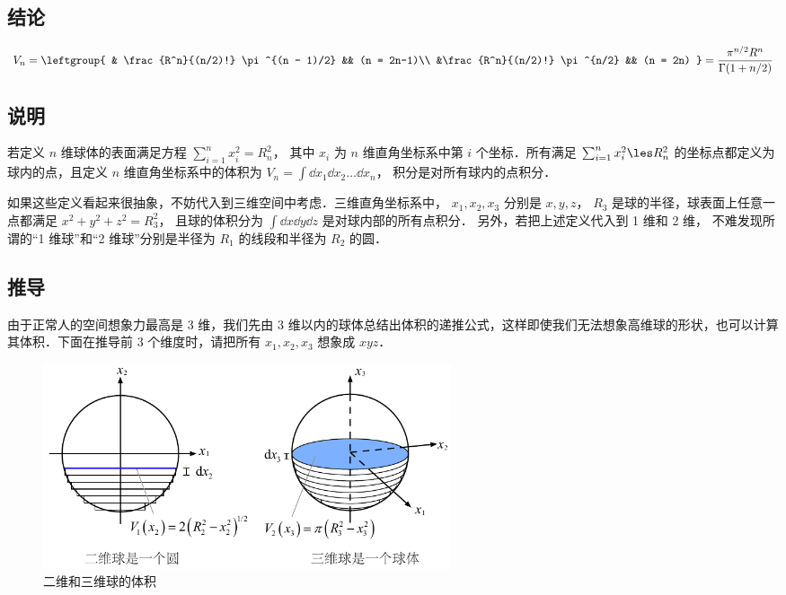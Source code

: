 
\subsection{结论}
\begin{equation}
V_n = \leftgroup{
& \frac{R^n}{(n/2)!} \pi^{(n - 1)/2} && (n = 2n-1)\\
&\frac{R^n}{(n/2)!} \pi^{n/2} && (n = 2n)
} = \frac{\pi^{n/2} R^n}{\Gamma (1 + n/2)}
\end{equation}
 
\subsection{说明}
若定义 $n$ 维球体的表面满足方程 $\sum_{i=1}^n x_i^2 = R_n^2$， 其中 $x_i$ 为 $n$ 维直角坐标系中第 $i$ 个坐标．所有满足 $\sum_{i=1}^n x_i^2 \les R_n^2$ 的坐标点都定义为球内的点，且定义 $n$ 维直角坐标系中的体积为 $V_n = \int \dd{x_1}\dd{x_2}\dots\dd{x_n}$， 积分是对所有球内的点积分．

如果这些定义看起来很抽象，不妨代入到三维空间中考虑．三维直角坐标系中， $x_1, x_2, x_3$ 分别是 $x,y,z$，  $R_3$ 是球的半径，球表面上任意一点都满足 $x^2 + y^2 + z^2 = R_3^2$， 且球的体积分为 $\int \dd{x}\dd{y}\dd{z}$ 是对球内部的所有点积分． 另外，若把上述定义代入到 1 维和 2 维， 不难发现所谓的“1 维球”和“2 维球”分别是半径为 $R_1$ 的线段和半径为 $R_2$ 的圆．

\subsection{推导}
由于正常人的空间想象力最高是 3 维，我们先由 3 维以内的球体总结出体积的递推公式，这样即使我们无法想象高维球的形状，也可以计算其体积．下面在推导前 3 个维度时，请把所有 $x_1, x_2, x_3$ 想象成 $xyz$． 
\begin{figure}[ht]
\centering
\includegraphics[width=12cm]{./figures/NSphV1.pdf}
\caption{二维和三维球的体积}
\end{figure}
